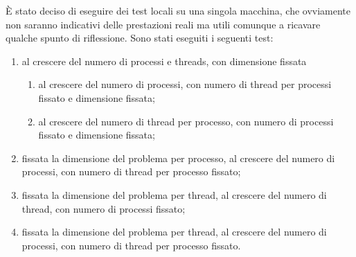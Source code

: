 È stato deciso di eseguire dei test locali su una singola macchina, che ovviamente non saranno indicativi delle prestazioni reali ma utili comunque a ricavare qualche spunto di riflessione.
Sono stati eseguiti i seguenti test:
\begin{enumerate}
    \item al crescere del numero di processi e threads, con dimensione fissata
          \begin{enumerate}
              \item al crescere del numero di processi, con numero di thread per processi fissato e
                    dimensione fissata;
              \item al crescere del numero di thread per processo, con numero di processi fissato e
                    dimensione fissata;
          \end{enumerate}
    \item fissata la dimensione del problema per processo, al crescere del numero di processi, con numero di thread per processo fissato;
    \item fissata la dimensione del problema per thread, al crescere del numero di thread, con numero di processi fissato;
    \item fissata la dimensione del problema per thread, al crescere del numero di processi, con numero di thread per processo fissato.
\end{enumerate}


